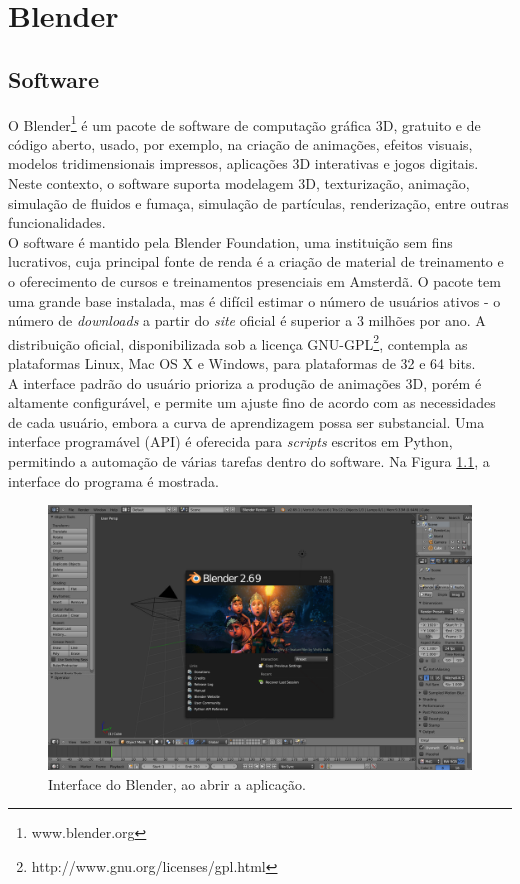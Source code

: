 \documentclass[12pt, a4paper, oneside]{book}
\begin{document}
%
%

\chapter{Blender}

\section{Software}
O Blender\footnote{www.blender.org} é um pacote de software de computação gráfica 3D, gratuito e de código aberto, usado, por exemplo, na criação de animações, efeitos visuais, modelos tridimensionais impressos, aplicações 3D interativas e jogos digitais. Neste contexto, o software suporta modelagem 3D, texturização, animação, simulação de fluidos e fumaça, simulação de partículas, renderização, entre outras funcionalidades. \\

O software é mantido pela Blender Foundation, uma instituição sem fins lucrativos, cuja principal fonte de renda é a criação de material de treinamento e o oferecimento de cursos e treinamentos presenciais em Amsterdã. O pacote tem uma grande base instalada, mas é difícil estimar o número de usuários ativos - o número de {\it downloads} a partir do {\it site} oficial é superior a 3 milhões por ano. A distribuição oficial, disponibilizada sob a licença GNU-GPL\footnote{http://www.gnu.org/licenses/gpl.html}, contempla as plataformas Linux, Mac OS X e Windows, para plataformas de 32 e 64 bits. \\

A interface padrão do usuário prioriza a produção de animações 3D, porém é altamente configurável, e permite um ajuste fino de acordo com as necessidades de cada usuário, embora a curva de aprendizagem possa ser substancial. Uma interface programável (API) é oferecida para {\it scripts} escritos em Python, permitindo a automação de várias tarefas dentro do software. Na Figura \ref{blender_gui}, a interface do programa é mostrada. \\ 

\begin{figure}[!htb]
\center
\includegraphics[width=17cm]{blender_gui}
\caption{Interface do Blender, ao abrir a aplicação.}
\label{blender_gui}
\end{figure}
\end{document}
